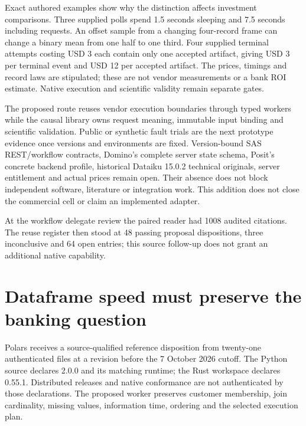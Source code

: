 Exact authored examples show why the distinction affects investment
comparisons. Three supplied polls spend 1.5 seconds sleeping and 7.5
seconds including requests. An offset sample from a changing four-record
frame can change a binary mean from one half to one third. Four supplied
terminal attempts costing USD 3 each contain only one accepted artifact,
giving USD 3 per terminal event and USD 12 per accepted artifact. The
prices, timings and record laws are stipulated; these are not vendor
measurements or a bank ROI estimate. Native execution and scientific
validity remain separate gates.
\citep{exec23_workflow_delegates_reference}

The proposed route reuses vendor execution boundaries through typed
workers while the causal library owns request meaning, immutable input
binding and scientific validation. Public or synthetic fault trials are
the next prototype evidence once versions and environments are fixed.
Version-bound SAS REST/workflow contracts, Domino's complete server
state schema, Posit's concrete backend profile, historical Dataiku
15.0.2 technical originals, server entitlement and actual prices remain
open. Their absence does not block independent software, literature or
integration work. This addition does not close the commercial cell or
claim an implemented adapter.

At the workflow delegate review the paired reader had 1008 audited
citations. The reuse register then stood at 48 passing proposal
dispositions, three inconclusive and 64 open entries; this source
follow-up does not grant an additional native capability.
\citep{sp23delegates_reader,sp23delegates_progress}

\hypertarget{dataframe-speed-must-preserve-the-banking-question}{%
\section{Dataframe speed must preserve the banking
question}\label{dataframe-speed-must-preserve-the-banking-question}}

Polars receives a source-qualified reference disposition from twenty-one
authenticated files at a revision before the 7 October 2026 cutoff. The
Python source declares 2.0.0 and its matching runtime; the Rust
workspace declares 0.55.1. Distributed releases and native conformance
are not authenticated by those declarations. The proposed worker
preserves customer membership, join cardinality, missing values,
information time, ordering and the selected execution plan.
\citep{exec23_polars_sources}

